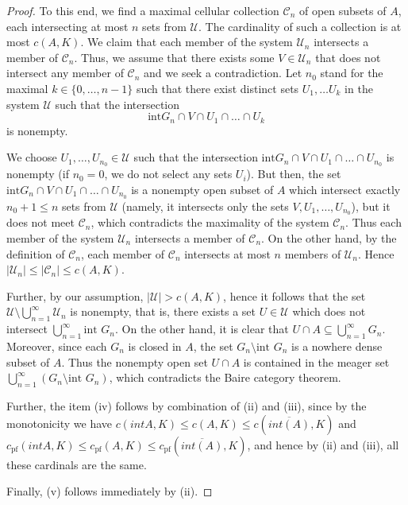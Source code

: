 \documentclass{amsart}
\numberwithin{equation}{section}
\theoremstyle{definition}
\def\C{\mathcal C}
\newcommand{\abs}[1]{\left| #1  \right|}
\begin{document}
\begin{proof}
To this end, we find a maximal cellular collection $\mathcal{C}_n$ of open subsets of $A$, each intersecting at most $n$ sets from $\mathcal{U}$. The cardinality of such a collection is at most $c(A, K)$. We claim that each member of the system $\mathcal{U}_n$ intersects a member of $\mathcal{C}_n$. Thus, we assume that there exists some $V \in \mathcal{U}_n$ that does not intersect any member of $\mathcal{C}_n$ and we seek a contradiction. Let $n_0$ stand for the maximal $k \in \{0, \ldots, n-1\}$ such that there exist distinct sets $U_{1}, \ldots U_k$ in the system $\mathcal{U}$ such that the intersection
\[\text{int} G_n \cap V \cap U_1 \cap \ldots \cap U_k\]
is nonempty.

We choose $U_1, \ldots, U_{n_0} \in \mathcal{U}$ such that the intersection $ \text{int} G_n \cap V\cap U_1 \cap \ldots \cap U_{n_0}$ is nonempty (if $n_0=0$, we do not select any sets $U_i$). But then, the set $\text{int} G_n \cap V \cap U_1 \cap \ldots \cap U_{n_0}$ is a nonempty open subset of $A$ which intersect exactly $n_0+1 \leq n$ sets from $\mathcal{U}$ (namely, it intersects only the sets $V, U_1, \ldots, U_{n_0}$), but it does not meet $\mathcal{C}_n$, which contradicts the maximality of the system $\mathcal{C}_n$. Thus each member of the system $\mathcal{U}_n$ intersects a member of $\mathcal{C}_n$. On the other hand, by the definition of $\C_n$, each member of $\C_n$ intersects at most $n$ members of $\mathcal{U}_n$. Hence $\abs{\mathcal{U}_n} \leq \abs{\mathcal{C}_n} \leq c(A, K)$.

Further, by our assumption, $\abs{\mathcal{U}}>c(A, K)$, hence it follows that the set $\mathcal{U} \setminus \bigcup_{n=1}^{\infty} \mathcal{U}_n$ is nonempty, that is, there exists a set $U \in \mathcal{U}$ which does not intersect $\bigcup_{n=1}^{\infty} \text{int } G_n$. On the other hand, it is clear that $U \cap A \subseteq \bigcup_{n=1}^{\infty} G_n$. Moreover, since each $G_n$ is closed in $A$, the set $G_n \setminus \text{int } G_n$ is a nowhere dense subset of $A$. Thus the nonempty open set $U \cap A$ is contained in the meager set $\bigcup_{n=1}^{\infty} (G_n \setminus \text{int } G_n)$, which contradicts the Baire category theorem. 

Further, the item (iv) follows by combination of (ii) and (iii), since by the monotonicity we have $c(int A, K) \leq c(A, K) \leq c(\overline{int(A)}, K)$ and 
$c_{\text{pf}}(int A, K) \leq c_{\text{pf}}(A, K) \leq c_{\text{pf}}(\overline{int(A)}, K)$, and hence by (ii) and (iii), all these cardinals are the same.

Finally, (v) follows immediately by (ii). 
\end{proof}
\end{document}
